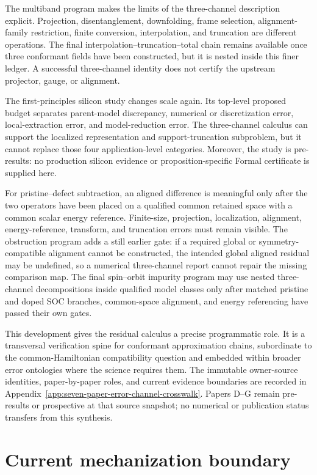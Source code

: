 The multiband program makes the limits of the three-channel description explicit.
Projection, disentanglement, downfolding, frame selection, alignment-family restriction,
finite conversion, interpolation, and truncation are different operations.  The final
interpolation--truncation--total chain remains available once three conformant fields
have been constructed, but it is nested inside this finer ledger.  A successful
three-channel identity does not certify the upstream projector, gauge, or alignment.

The first-principles silicon study changes scale again.  Its top-level proposed budget
separates parent-model discrepancy, numerical or discretization error, local-extraction
error, and model-reduction error.  The three-channel calculus can support the localized
representation and support-truncation subproblem, but it cannot replace those four
application-level categories.  Moreover, the study is pre-results: no production
silicon evidence or proposition-specific Formal certificate is supplied here.

For pristine--defect subtraction, an aligned difference is meaningful only after the
two operators have been placed on a qualified common retained space with a common
scalar energy reference.  Finite-size, projection, localization, alignment,
energy-reference, transform, and truncation errors must remain visible.  The obstruction
program adds a still earlier gate: if a required global or symmetry-compatible
alignment cannot be constructed, the intended global aligned residual may be
undefined, so a numerical three-channel report cannot repair the missing comparison
map.  The final spin--orbit impurity program may use nested three-channel decompositions
inside qualified model classes only after matched pristine and doped SOC branches,
common-space alignment, and energy referencing have passed their own gates.

This development gives the residual calculus a precise programmatic role.  It is a
transversal verification spine for conformant approximation chains, subordinate to the
common-Hamiltonian compatibility question and embedded within broader error ontologies
where the science requires them.  The immutable owner-source identities, paper-by-paper
roles, and current evidence boundaries are recorded in
Appendix~\ref{app:seven-paper-error-channel-crosswalk}.  Papers D--G remain pre-results
or prospective at that source snapshot; no numerical or publication status transfers
from this synthesis.

\section{Current mechanization boundary}

